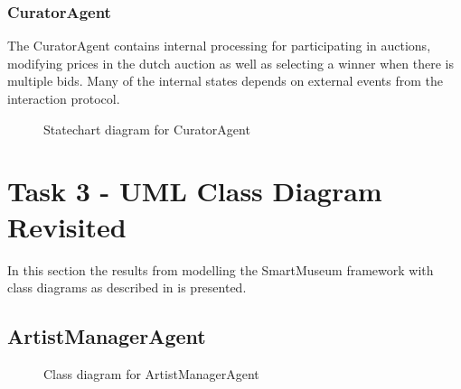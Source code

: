 \documentclass[paper=letter, fontsize=12pt]{article}
\begin{document}
\subsubsection{CuratorAgent}
The CuratorAgent contains internal processing for participating in auctions, modifying prices in the dutch auction as well as selecting a winner when there is multiple bids. Many of the internal states depends on external events from the interaction protocol.
\begin{figure}[H]
  \begin{center}
    \caption{Statechart diagram for CuratorAgent}
    \label{fig:curator_state}
  \end{center}
\end{figure}

\section{Task 3 - UML Class Diagram Revisited}
In this section the results from modelling the SmartMuseum framework with class diagrams as described in \citep{class_diagram} is presented.
\subsection{ArtistManagerAgent}
\begin{figure}[H]
  \begin{center}
    \caption{Class diagram for ArtistManagerAgent}
    \label{fig:artistmanager_class}
  \end{center}
\end{figure}
\end{document}
